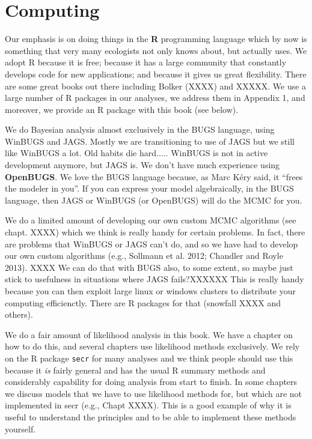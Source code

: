 \section*{Computing}

Our emphasis is on doing things in the {\bf R} programming language
which by now is something that very many ecologists not only knows
about, but actually uses. We adopt R because it is free; because it
has a large community that constantly develops code for new
applications; and because it gives us great flexibility.  There are
some great books out there including Bolker (XXXX) and XXXXX. We use a
large number of R packages in our analyses, we address them in
Appendix 1, and moreover, we provide an R package with this book (see
below).

We do Bayesian analysis almost exclusively in the BUGS language, using
WinBUGS and JAGS. Mostly we are transitioning to use of JAGS but we
still like WinBUGS a lot. Old habits die hard..... WinBUGS is not in
active development anymore, but JAGS is. We don't have much experience
using {\bf OpenBUGS}.
We love the BUGS language
because, as Marc K\'{e}ry said, it ``frees the modeler in you''.
If you can express your model algebraically, in the BUGS language,
then JAGS or WinBUGS (or OpenBUGS) will do the MCMC for you. 

We do a limited amount of developing our own custom MCMC algorithms
(see chapt. XXXX) which we think is really handy for certain
problems. In fact, there are problems that WinBUGS or JAGS can't do,
and so we have had to develop our own custom algorithms (e.g.,
Sollmann et al. 2012; Chandler and Royle 2013). 
XXXX We can do that with BUGS also, to some extent, so maybe just stick to usefulness in situations where JAGS fails?XXXXXX
This is really handy
because you can then exploit large linux or windows clusters to
distribute your computing efficienctly. There are R packages for that
(snowfall XXXX and others). 

We do a fair amount of likelihood analysis in this book. We have a
chapter on how to do this, and several chapters use likelihood methods
exclusively. We rely 
on the R package \mbox{\tt secr} \citep{efford_etal:2009euring} for
many analyses and we think people should use this because it {\it is}
fairly general and has the usual R summary methods and considerably
capability for doing analysis from start to finish. In some chapters
we discuss models that we have to use likelihood methods for, but
which are not implemented in secr  (e.g., Chapt XXXX). This is a good
example of why it
is useful to understand the principles and to be able to implement
these methods yourself. 


